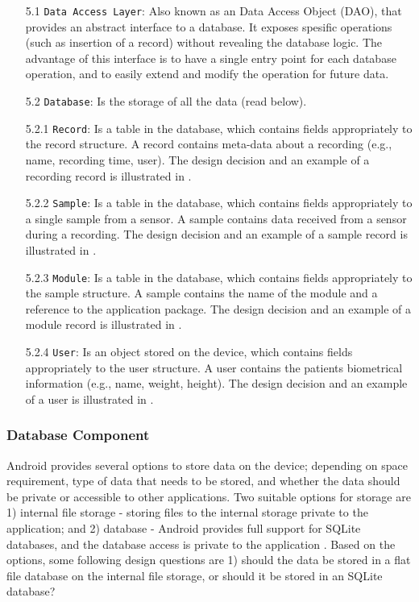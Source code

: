 \begin{itemize}
    \item[5.1] \verb|Data Access Layer|: Also known as an Data Access Object (DAO), that provides an abstract interface to a database. It exposes spesific operations (such as insertion of a record) without revealing the database logic. The advantage of this interface is to have a single entry point for each database operation, and to easily extend and modify the operation for future data. 
    \item[5.2] \verb|Database|: Is the storage of all the data (read below).
    \item[5.2.1] \verb|Record|: Is a table in the database, which contains fields appropriately to the record structure. A record contains meta-data about a recording (e.g., name, recording time, user). The design decision and an example of a recording record is illustrated in .
    \item[5.2.2] \verb|Sample|: Is a table in the database, which contains fields appropriately to a single sample from a sensor. A sample contains data received from a sensor during a recording. The design decision and an example of a sample record is illustrated in .
    \item[5.2.3] \verb|Module|: Is a table in the database, which contains fields appropriately to the sample structure. A sample contains the name of the module and a reference to the application package. The design decision and an example of a module record is illustrated in .
    \item[5.2.4] \verb|User|: Is an object stored on the device, which contains fields appropriately to the user structure. A user contains the patients biometrical information (e.g., name, weight, height). The design decision and an example of a user is illustrated in .
\end{itemize}

\subsubsection{Database Component}

\noindent Android provides several options to store data on the device; depending on space requirement, type of data that needs to be stored, and whether the data should be private or accessible to other applications. Two suitable options for storage are 1) internal file storage - storing files to the internal storage private to the application; and 2) database - Android provides full support for SQLite databases, and the database access is private to the application \cite{android_storage}. Based on the options, some following design questions are 1) should the data be stored in a flat file database on the internal file storage, or should it be stored in an SQLite database?

